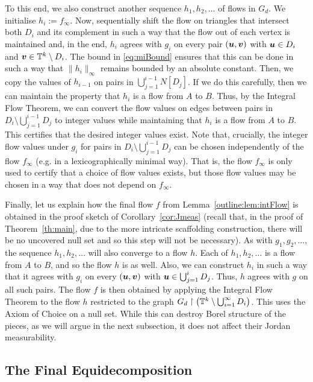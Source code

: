 \documentclass[12pt,a4paper]{amsart}
\numberwithin{equation}{section}
\theoremstyle{definition}
\begin{document}
To this end, we also construct another sequence $h_1,h_2,\dots$ of flows in $G_d$. We initialise $h_i:=f_\infty$. Now, sequentially shift the flow on triangles  that intersect both $D_i$ and its complement in such a way that the flow out of each vertex is maintained and, in the end, $h_i$ agrees with $g_i$ on every pair $(\boldsymbol{u},\boldsymbol{v})$ with $\boldsymbol{u}\in D_i$ and $\boldsymbol{v}\in\mathbb{T}^k\setminus D_i$. The bound in \eqref{eq:miBound} ensures that this can be done in such a way that $\|h_i\|_\infty$ remains bounded by an absolute constant. Then, we copy the values of $h_{i-1}$ on pairs in $\bigcup_{j=1}^{i-1}N[D_j]$. If we do this carefully, then we can maintain the property that $h_i$ is a flow from $A$ to $B$. Thus, by the Integral Flow Theorem, we can convert the flow values on edges between pairs in $D_i\setminus\bigcup_{j=1}^{i-1}D_j$ to integer values while maintaining that $h_i$ is a flow from $A$ to $B$. This certifies that the desired integer values exist. Note that, crucially, the integer flow values under $g_i$ for pairs in $D_i\setminus\bigcup_{j=1}^{i-1}D_j$ can be chosen independently of the flow $f_\infty$ (e.g. in a lexicographically minimal way). That is, the flow $f_\infty$ is only used to certify that a choice of flow values exists, but those flow values may be chosen in a way that does not depend on $f_\infty$.

Finally, let us explain how the final flow $f$ from Lemma~\ref{outline:lem:intFlow} is obtained in the proof sketch of Corollary~\ref{cor:Jmeas} (recall that, in the proof of Theorem~\ref{th:main}, due to the more intricate scaffolding construction, there will be no uncovered null set and so this step will not be necessary). As with $g_1,g_2,\dots$, the sequence $h_1,h_2,\dots$ will also converge to a flow $h$. Each of $h_1,h_2,\dots$ is a flow from $A$ to $B$, and so the flow $h$ is as well. Also, we can construct $h_i$ in such a way that it agrees with $g_i$ on every $(\boldsymbol{u},\boldsymbol{v})$ with $\boldsymbol{u}\in\bigcup_{j=1}^iD_j$. Thus, $h$ agrees with $g$ on all such pairs. The flow $f$ is then obtained by applying the Integral Flow Theorem to the flow $h$ restricted to the graph $G_d\upharpoonright \left(\mathbb{T}^k\setminus \bigcup_{i=1}^\infty D_i\right)$. This uses the Axiom of Choice  on a null set. While this can destroy Borel structure of the pieces, as we will argue in the next subsection, it does not affect their Jordan measurability. 

\subsection{The Final Equidecomposition}
\label{subsec:final}
\end{document}
